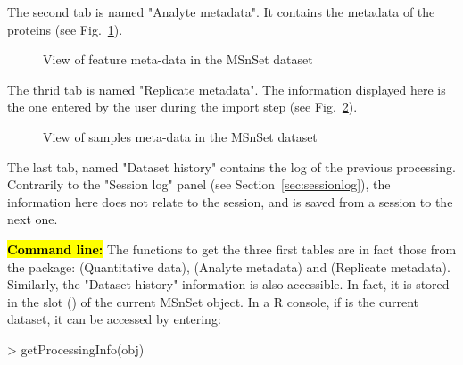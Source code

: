 \documentclass[12pt]{article}
\begin{document}
{The second tab is named "Analyte metadata". It contains the metadata of the 
proteins (see Fig.~\ref{fig:sdqv2}).

\begin {figure}
\centering
{}
\caption{View of feature meta-data in the MSnSet dataset}\label{fig:sdqv2}
\end {figure}

The thrid tab is named "Replicate metadata". The information displayed here 
is the one entered by the user during the import step 
(see Fig.~\ref{fig:sdqv3}).

\begin {figure}
\centering
{}
\caption{View of samples meta-data in the MSnSet dataset}\label{fig:sdqv3}
\end {figure}

The last tab, named "Dataset history" contains the log of the previous 
processing. Contrarily to the "Session log" panel (see 
Section~\ref{sec:sessionlog}), the information here does not relate to the 
session, and is saved from a session to the next one.

\hl{\bf Command line:}  The  functions to get the three first 
tables are in fact those from the  package: 
 (Quantitative data),  
(Analyte metadata) and  (Replicate metadata). 
Similarly, the "Dataset history" information is also accessible. In fact, 
it is stored in the slot () of the current MSnSet 
object. In a R console, if  is the current dataset, it can be 
accessed by entering:
\begin{Schunk}
\begin{Sinput}
> getProcessingInfo(obj)
\end{Sinput}
\end{Schunk}

}
\end{document}
